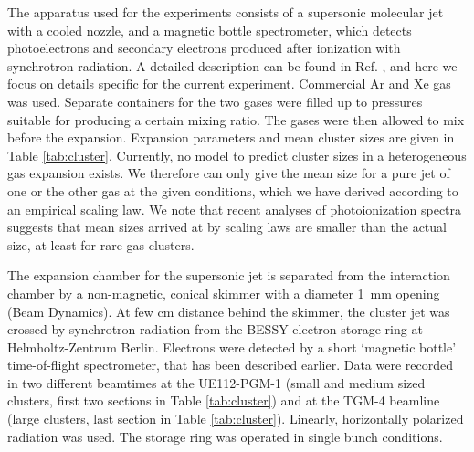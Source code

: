 %
%
The apparatus used for the experiments consists of a supersonic molecular jet with a cooled nozzle, and a magnetic bottle spectrometer, which detects photoelectrons and secondary electrons produced after ionization with synchrotron radiation.\cite{arion} 
A detailed description can be found in Ref. , and here we focus on details specific for the current experiment. Commercial Ar and Xe gas was used. 
Separate containers for the two gases were filled up to pressures suitable for producing a certain mixing ratio. The gases were then allowed to mix before the expansion. 
Expansion parameters and mean cluster sizes are given in Table \ref{tab:cluster}. 
Currently, no model to predict cluster sizes in a heterogeneous gas expansion exists. 
We therefore can only give the mean size for a pure jet of one or the other gas at the given conditions, which we have derived according to an empirical scaling law.\cite{hagena1981} 
We note that recent analyses of photoionization spectra suggests that  mean sizes arrived at by scaling laws are smaller than the actual size, at least for rare gas clusters.\cite{bergersen,hergenhahnprb,foerstel_arg2_2011}

The expansion chamber for the supersonic jet is separated from the interaction chamber by a non-magnetic, conical skimmer with a diameter 1~mm opening (Beam Dynamics). 
At few cm distance behind the skimmer, the cluster jet was crossed by synchrotron radiation from the BESSY electron storage ring at Helmholtz-Zentrum Berlin. 
Electrons were detected by a short `magnetic bottle' time-of-flight spectrometer, that has been described earlier.\cite{mucke_review} 
Data were recorded in two different beamtimes at the UE112-PGM-1 (small and medium sized clusters, first two sections in Table \ref{tab:cluster}) and at the TGM-4 beamline (large clusters, last section in Table \ref{tab:cluster}). 
Linearly, horizontally polarized radiation was used. 
The storage ring was operated in single bunch conditions.
